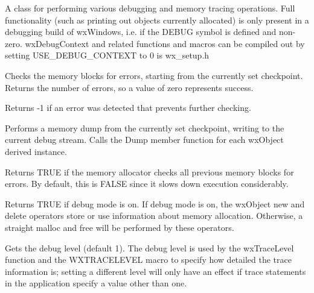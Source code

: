 
A class for performing various debugging and memory tracing
operations. Full functionality (such as printing out objects
currently allocated) is only present in a debugging build of wxWindows,
i.e. if the DEBUG symbol is defined and non-zero. wxDebugContext
and related functions and macros can be compiled out by setting
USE\_DEBUG\_CONTEXT to 0 is wx\_setup.h



Checks the memory blocks for errors, starting from the currently set
checkpoint. Returns the number of errors,
so a value of zero represents success.

Returns -1 if an error was detected that prevents further checking.



Performs a memory dump from the currently set checkpoint, writing to the
current debug stream. Calls the Dump member function for each wxObject
derived instance.



Returns TRUE if the memory allocator checks all previous memory blocks for errors.
By default, this is FALSE since it slows down execution considerably.



Returns TRUE if debug mode is on. If debug mode is on, the wxObject new and delete
operators store or use information about memory allocation. Otherwise,
a straight malloc and free will be performed by these operators.



Gets the debug level (default 1). The debug level is used by the wxTraceLevel function and
the WXTRACELEVEL macro to specify how detailed the trace information is; setting
a different level will only have an effect if trace statements in the application
specify a value other than one.


